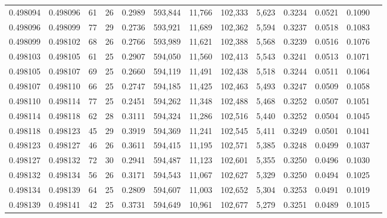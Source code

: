 \begin{tabular}{rrrrrrrrrrrrr}
0.498094 & 0.498096 &  61 &  26 &                                     0.2989 & 593,844 &  11,766 & 102,333 &   5,623 & 0.3234 & 0.0521 & 0.1090 \\
0.498096 & 0.498099 &  77 &  29 &                                     0.2736 & 593,921 &  11,689 & 102,362 &   5,594 & 0.3237 & 0.0518 & 0.1083 \\
0.498099 & 0.498102 &  68 &  26 &                                     0.2766 & 593,989 &  11,621 & 102,388 &   5,568 & 0.3239 & 0.0516 & 0.1076 \\
0.498103 & 0.498105 &  61 &  25 &                                     0.2907 & 594,050 &  11,560 & 102,413 &   5,543 & 0.3241 & 0.0513 & 0.1071 \\
0.498105 & 0.498107 &  69 &  25 &                                     0.2660 & 594,119 &  11,491 & 102,438 &   5,518 & 0.3244 & 0.0511 & 0.1064 \\
0.498107 & 0.498110 &  66 &  25 &                                     0.2747 & 594,185 &  11,425 & 102,463 &   5,493 & 0.3247 & 0.0509 & 0.1058 \\
0.498110 & 0.498114 &  77 &  25 &                                     0.2451 & 594,262 &  11,348 & 102,488 &   5,468 & 0.3252 & 0.0507 & 0.1051 \\
0.498114 & 0.498118 &  62 &  28 &                                     0.3111 & 594,324 &  11,286 & 102,516 &   5,440 & 0.3252 & 0.0504 & 0.1045 \\
0.498118 & 0.498123 &  45 &  29 &                                     0.3919 & 594,369 &  11,241 & 102,545 &   5,411 & 0.3249 & 0.0501 & 0.1041 \\
0.498123 & 0.498127 &  46 &  26 &                                     0.3611 & 594,415 &  11,195 & 102,571 &   5,385 & 0.3248 & 0.0499 & 0.1037 \\
0.498127 & 0.498132 &  72 &  30 &                                     0.2941 & 594,487 &  11,123 & 102,601 &   5,355 & 0.3250 & 0.0496 & 0.1030 \\
0.498132 & 0.498134 &  56 &  26 &                                     0.3171 & 594,543 &  11,067 & 102,627 &   5,329 & 0.3250 & 0.0494 & 0.1025 \\
0.498134 & 0.498139 &  64 &  25 &                                     0.2809 & 594,607 &  11,003 & 102,652 &   5,304 & 0.3253 & 0.0491 & 0.1019 \\
0.498139 & 0.498141 &  42 &  25 &                                     0.3731 & 594,649 &  10,961 & 102,677 &   5,279 & 0.3251 & 0.0489 & 0.1015 \\

\end{tabular}
